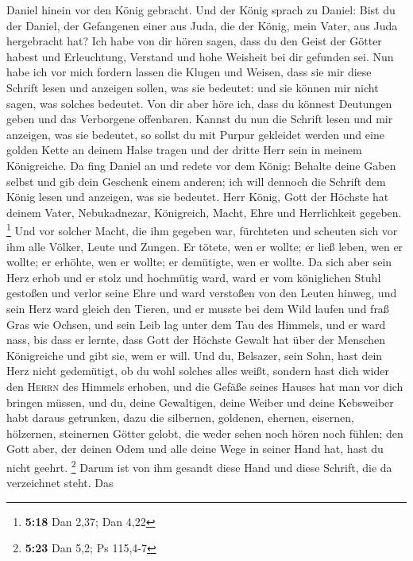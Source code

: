 Daniel hinein vor den König gebracht. Und der König sprach zu Daniel:
Bist du der Daniel, der Gefangenen einer aus Juda, die der König, mein
Vater, aus Juda hergebracht hat?  Ich habe von dir hören
sagen, dass du den Geist der Götter habest und Erleuchtung, Verstand und
hohe Weisheit bei dir gefunden sei.  Nun habe ich vor
mich fordern lassen die Klugen und Weisen, dass sie mir diese Schrift
lesen und anzeigen sollen, was sie bedeutet: und sie können mir nicht
sagen, was solches bedeutet.  Von dir aber höre ich, dass
du könnest Deutungen geben und das Verborgene offenbaren. Kannst du nun
die Schrift lesen und mir anzeigen, was sie bedeutet, so sollst du mit
Purpur gekleidet werden und eine golden Kette an deinem Halse tragen und
der dritte Herr sein in meinem Königreiche.  Da fing
Daniel an und redete vor dem König: Behalte deine Gaben selbst und gib
dein Geschenk einem anderen; ich will dennoch die Schrift dem König
lesen und anzeigen, was sie bedeutet.  Herr König, Gott
der Höchste hat deinem Vater, Nebukadnezar, Königreich, Macht, Ehre und
Herrlichkeit gegeben. \footnote{\textbf{5:18} Dan 2,37; Dan 4,22}
 Und vor solcher Macht, die ihm gegeben war, fürchteten
und scheuten sich vor ihm alle Völker, Leute und Zungen. Er tötete, wen
er wollte; er ließ leben, wen er wollte; er erhöhte, wen er wollte; er
demütigte, wen er wollte.  Da sich aber sein Herz erhob
und er stolz und hochmütig ward, ward er vom königlichen Stuhl gestoßen
und verlor seine Ehre  und ward verstoßen von den Leuten
hinweg, und sein Herz ward gleich den Tieren, und er musste bei dem Wild
laufen und fraß Gras wie Ochsen, und sein Leib lag unter dem Tau des
Himmels, und er ward nass, bis dass er lernte, dass Gott der Höchste
Gewalt hat über der Menschen Königreiche und gibt sie, wem er will.
 Und du, Belsazer, sein Sohn, hast dein Herz nicht
gedemütigt, ob du wohl solches alles weißt,  sondern hast
dich wider den \textsc{Herrn} des Himmels erhoben, und die Gefäße seines
Hauses hat man vor dich bringen müssen, und du, deine Gewaltigen, deine
Weiber und deine Kebsweiber habt daraus getrunken, dazu die silbernen,
goldenen, ehernen, eisernen, hölzernen, steinernen Götter gelobt, die
weder sehen noch hören noch fühlen; den Gott aber, der deinen Odem und
alle deine Wege in seiner Hand hat, hast du nicht geehrt. \footnote{\textbf{5:23}
  Dan 5,2; Ps 115,4-7}  Darum ist von ihm gesandt diese
Hand und diese Schrift, die da verzeichnet steht.  Das
